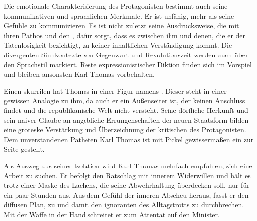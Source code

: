Die emotionale Charakterisierung des Protagonisten bestimmt auch seine
kommunikativen und sprachlichen Merkmale. Er ist unfähig, mehr als seine Gefühle zu
kommunizieren. Es ist nicht zuletzt seine Ausdrucksweise, die mit ihren Pathos
und den \Cite{Begriffen, die nicht mehr stimmen} , dafür
sorgt, dass es zwischen
ihm und denen, die er der Tatenlosigkeit bezichtigt, zu keiner inhaltlichen
Verständigung kommt. 
Die divergenten Sinnkontexte von Gegenwart und Revolutionszeit werden auch
über den Sprachstil markiert. Reste expressionistischer Diktion finden sich
im Vorspiel und bleiben ansonsten Karl Thomas vorbehalten.

Einen skurrilen  hat Thomas in einer Figur namens
\Cite{Pickel}. Dieser steht in einer gewissen Analogie zu ihm, da auch er
ein Außenseiter ist, der keinen Anschluss findet und die republikanische Welt
nicht versteht.
Seine dörfliche Herkunft und sein naiver Glaube an angebliche 
Errungenschaften der neuen Staatsform bilden eine groteske Verstärkung und
Überzeichnung der kritischen  des Protagonisten. Dem
unverstandenen Patheten Karl Thomas ist mit Pickel gewissermaßen ein
\Cite{karikiertes Gegenbild}
zur Seite gestellt.

Als Ausweg aus seiner Isolation wird Karl Thomas mehrfach empfohlen, sich eine
Arbeit zu suchen.
Er befolgt den Ratschlag  mit innerem Widerwillen und hält es trotz einer
Maske des Lachens, die seine Abwehrhaltung überdecken soll, nur für ein paar
Stunden aus. Aus dem Gefühl der inneren Abscheu heraus, fasst er den diffusen Plan,
\Cite{alle} zu \Cite{wecken}  und damit den
ignoranten 
des Alltagstrotts zu durchbrechen. Mit der Waffe in der Hand schreitet er zum
Attentat auf den Minister.

